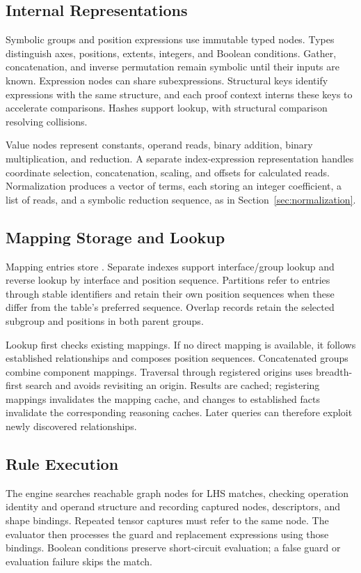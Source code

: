 \FloatBarrier
\subsection{Internal Representations}
Symbolic groups and position expressions use immutable typed nodes.
Types distinguish axes, positions, extents, integers, and Boolean conditions.
Gather, concatenation, and inverse permutation remain symbolic until their
inputs are known. Expression nodes can share subexpressions. Structural keys
identify expressions with the same structure, and each proof context interns
these keys to accelerate comparisons. Hashes support lookup, with structural
comparison resolving collisions.

Value nodes represent constants, operand reads, binary addition, binary
multiplication, and reduction. A separate index-expression representation
handles coordinate selection, concatenation, scaling, and offsets for
calculated reads. Normalization produces a vector of terms, each storing
an integer coefficient, a list of reads, and a symbolic reduction sequence,
as in Section~\ref{sec:normalization}.

\FloatBarrier
\subsection{Mapping Storage and Lookup}
Mapping entries store . Separate indexes
support interface/group lookup and reverse lookup by interface and position
sequence. Partitions refer to entries through stable identifiers and retain
their own position sequences when these differ from the table's preferred
sequence. Overlap records retain the selected subgroup and positions in both
parent groups.

Lookup first checks existing mappings. If no direct mapping is available,
it follows established relationships and composes position sequences.
Concatenated groups combine component mappings. Traversal through registered
origins uses breadth-first search and avoids revisiting an origin. Results
are cached; registering mappings invalidates the mapping cache, and changes
to established facts invalidate the corresponding reasoning caches. Later
queries can therefore exploit newly discovered relationships.

\FloatBarrier
\subsection{Rule Execution}
The engine searches reachable graph nodes for LHS matches, checking operation
identity and operand structure and recording captured nodes, descriptors, and
shape bindings. Repeated tensor captures must refer to the same node.
The evaluator then processes the guard and replacement expressions using
those bindings. Boolean conditions preserve short-circuit evaluation; a
false guard or evaluation failure skips the match.

